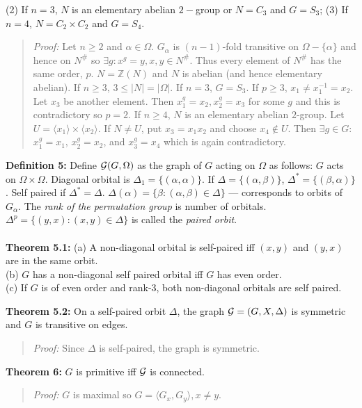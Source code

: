(2) If $n=3$, $N$ is an elementary abelian $2-$group or $N=C_3$ and $G=S_3$;
(3) If $n=4$, $N= C_2 \times C_2$ and $G=S_4$.
\begin{quote}
\emph{Proof:}  
Let $n \geq 2$ and $\alpha \in \Omega$.  $G_{\alpha}$ is $(n-1)$-fold transitive on $\Omega - \{ \alpha \}$ and
hence on $N^{\#}$ so $\exists g: x^g=y, x,y \in N^{\#}$.  Thus every element of $N^{\#}$ has the same order, $p$.
$N= {\mathbb Z}(N)$ and $N$ is abelian (and hence elementary abelian).
If $n \geq 3$, $3 \leq |N|=|\Omega|$.  If $n=3$, $G=S_3$.  If $p \geq 3$, $x_1 \neq x_1^{-1}=x_2$.  Let $x_3$ be another 
element.  Then $x_1^g= x_2, x_2^g=x_3$ for some $g$ and this is contradictory so $p=2$.
If $n \geq 4$, $N$ is an elementary abelian $2$-group.  Let $U= \langle x_1 \rangle \times \langle x_2 \rangle$.
If $N \neq U$, put $x_3=x_1 x_2$ and choose $x_4 \notin U$.  Then $\exists g \in G:$
$x_1^g= x_1$,
$x_2^g= x_2$, and
$x_3^g= x_4$ which is again contradictory.
\end{quote}
{\bf Definition 5:}
Define ${\cal G}(G, \Omega )$ as the graph of $G$ acting on $\Omega$ as follows:
$G$ acts on $\Omega \times \Omega$.  Diagonal orbital is
$\Delta_1 = \{ (\alpha , \alpha )\}$. If $\Delta = \{ (\alpha , \beta ) \}$,
$\Delta^*= \{ (\beta, \alpha) \}$.  Self paired if $\Delta^* = \Delta$.
$\Delta(\alpha)= \{ \beta : (\alpha , \beta ) \in \Delta \}$ --- corresponds to 
orbits of $G_{\alpha}$. The \emph{rank of the permutation group} is number of orbitals.
$\Delta^p= \{ (y,x): (x, y) \in \Delta \}$ is called the \emph{paired orbit}.
\\
\\
{\bf Theorem 5.1:} 
(a) A non-diagonal orbital is self-paired iff $(x,y)$ and $(y,x)$ are in the same orbit.\\
(b) $G$ has a non-diagonal self paired orbital iff $G$ has even order. \\
(c) If $G$ is of even order and rank-3, both non-diagonal orbitals are self paired.
\begin{quote}
\end{quote}
{\bf Theorem 5.2:}
On a self-paired orbit $\Delta$, the graph ${\cal G}=(G, X,\Delta)$ is 
symmetric and $G$ is transitive on edges.
\begin{quote}
\emph{Proof:}  
Since $\Delta$ is self-paired, the graph is symmetric.  
\end{quote}
{\bf Theorem 6:}
$G$ is primitive iff ${\cal G}$ is connected.
\begin{quote}
\emph{Proof:}  
$G$ is maximal so $G= \langle G_x , G_y \rangle , x \ne y$.
\end{quote}
